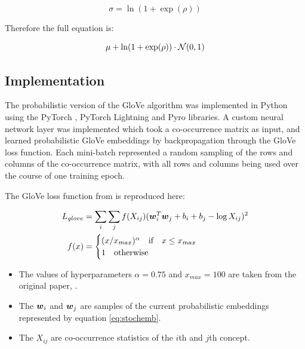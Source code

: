 \begin{equation*}
    \sigma = \ln (1 + \exp (\rho))
\end{equation*}

Therefore the full equation is:

\begin{equation}
\label{eq:stochemb}
    \mu + \ln (1 + \exp(\rho)) \cdot \mathcal{N}(0, 1)
\end{equation}

\subsection{Implementation}

The probabilistic version of the GloVe algorithm was implemented in Python using the PyTorch \cite{pytorch}, PyTorch Lightning \cite{pytorchlightning} and Pyro \cite{pyro} libraries. A custom neural network layer was implemented which took a co-occurrence matrix as input, and learned probabilistic GloVe embeddings by backpropagation through the GloVe loss function. Each mini-batch represented a random sampling of the rows and columns of the co-occurrence matrix, with all rows and columns being used over the course of one training epoch. 

The GloVe loss function from \cite{pennington2014glove} is reproduced here:

\begin{equation}
\label{eq:gloveloss}
\begin{split}
L_{glove} &= \sum_i \sum_j f(X_{ij}) (\boldsymbol{w}_i^T \boldsymbol{w}_j + b_i + b_j - \log X_{ij})^2\\
f(x) &= \begin{cases}
(x/x_{max})^{\alpha}\quad \text{if} \quad x \le x_{max}\\
1\quad \text{otherwise} \quad
\end{cases}
\end{split}
\end{equation}

\begin{itemize}
    \item The values of hyperparameters $\alpha = 0.75$ and $x_{max} = 100$  are taken from the original paper, \cite{pennington2014glove}. 
    \item The $\boldsymbol{w}_i$ and $\boldsymbol{w}_j$ are samples of the current probabilistic embeddings represented by equation \ref{eq:stochemb}. 
    \item The $X_{ij}$ are co-occurrence statistics of the $i$th and $j$th concept.
\end{itemize}

